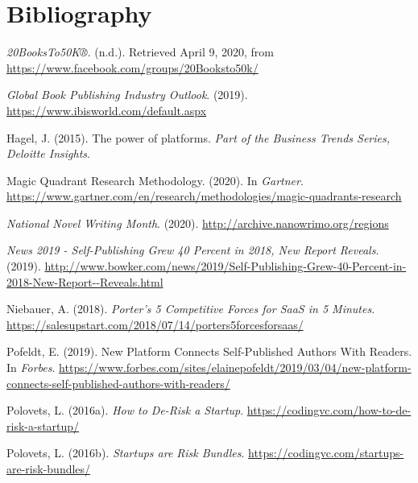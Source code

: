 \documentclass[10pt,openany]{book}
\newlength{\cslhangindent}
\newenvironment{cslreferences}%
  {\setlength{\parindent}{0pt}%
  \everypar{\setlength{\hangindent}{\cslhangindent}}\ignorespaces}%
  {\par}
\begin{document}
\hypertarget{bibliography}{%
\section*{Bibliography}\label{bibliography}}

\hypertarget{refs}{}
\begin{cslreferences}
\leavevmode\hypertarget{ref-noauthor_20booksto50k_nodate}{}%
\emph{20BooksTo50K®}. (n.d.). Retrieved April 9, 2020, from
\url{https://www.facebook.com/groups/20Booksto50k/}

\leavevmode\hypertarget{ref-noauthor_ibisworld_nodate}{}%
\emph{Global Book Publishing Industry Outlook}. (2019).
\url{https://www.ibisworld.com/default.aspx}

\leavevmode\hypertarget{ref-hagel_power_2015}{}%
Hagel, J. (2015). The power of platforms. \emph{Part of the Business
Trends Series, Deloitte Insights}.

\leavevmode\hypertarget{ref-gartner_magic_nodate}{}%
Magic Quadrant Research Methodology. (2020). In \emph{Gartner}.
\url{https://www.gartner.com/en/research/methodologies/magic-quadrants-research}

\leavevmode\hypertarget{ref-noauthor_national_nodate}{}%
\emph{National Novel Writing Month}. (2020).
\url{http://archive.nanowrimo.org/regions}

\leavevmode\hypertarget{ref-bowker_news_nodate}{}%
\emph{News 2019 - Self-Publishing Grew 40 Percent in 2018, New Report
Reveals}. (2019).
\url{http://www.bowker.com/news/2019/Self-Publishing-Grew-40-Percent-in-2018-New-Report--Reveals.html}

\leavevmode\hypertarget{ref-annelise_porters_nodate}{}%
Niebauer, A. (2018). \emph{Porter's 5 Competitive Forces for SaaS in 5
Minutes}.
\url{https://salesupstart.com/2018/07/14/porters5forcesforsaas/}

\leavevmode\hypertarget{ref-pofeldt_new_nodate}{}%
Pofeldt, E. (2019). New Platform Connects Self-Published Authors With
Readers. In \emph{Forbes}.
\url{https://www.forbes.com/sites/elainepofeldt/2019/03/04/new-platform-connects-self-published-authors-with-readers/}

\leavevmode\hypertarget{ref-polovets_how_nodate}{}%
Polovets, L. (2016a). \emph{How to De-Risk a Startup}.
\url{https://codingvc.com/how-to-de-risk-a-startup/}

\leavevmode\hypertarget{ref-polovets_startups_nodate}{}%
Polovets, L. (2016b). \emph{Startups are Risk Bundles}.
\url{https://codingvc.com/startups-are-risk-bundles/}


\end{cslreferences}
\end{document}
